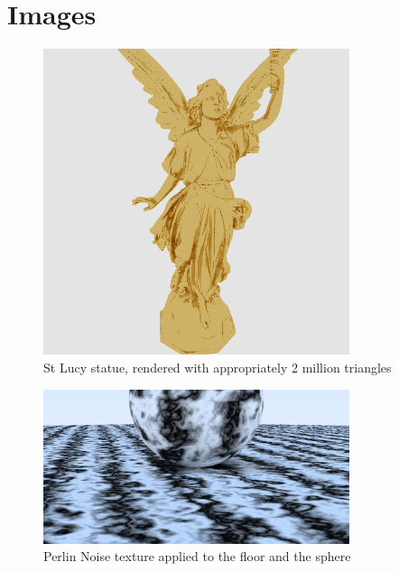 \documentclass[../main.tex]{subfiles}
\begin{document}
\section{Images}
\begin{figure}[!htb]
    \centering
    \includegraphics[width=0.8\textwidth]{images/lucy.png}
    \caption{St Lucy statue, rendered with appropriately 2 million triangles}
    \label{fig:Lucy}
\end{figure}
\begin{figure}[!htb]
    \centering
    \includegraphics[width=0.8\textwidth]{images/marbling.png}
    \caption{Perlin Noise texture applied to the floor and the sphere}
    \label{fig:Marbling}
\end{figure}
\end{document}

